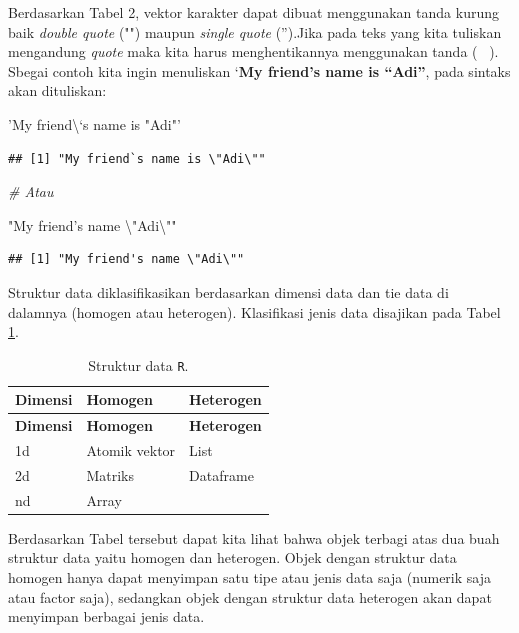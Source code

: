 \documentclass[]{book}
\newenvironment{Shaded}{\begin{snugshade}}{\end{snugshade}}
\newcommand{\CharTok}[1]{\textcolor[rgb]{0.31,0.60,0.02}{#1}}
\newcommand{\CommentTok}[1]{\textcolor[rgb]{0.56,0.35,0.01}{\textit{#1}}}
\newcommand{\StringTok}[1]{\textcolor[rgb]{0.31,0.60,0.02}{#1}}
\theoremstyle{definition}
\theoremstyle{definition}
\theoremstyle{definition}
\theoremstyle{remark}
\begin{document}
Berdasarkan Tabel 2, vektor karakter dapat dibuat menggunakan tanda kurung baik \emph{double quote} ("") maupun \emph{single quote} ('').Jika pada teks yang kita tuliskan mengandung \emph{quote} maka kita harus menghentikannya menggunakan tanda ( ~). Sbegai contoh kita ingin menuliskan `\textbf{My friend's name is ``Adi''}, pada sintaks akan dituliskan:

\begin{Shaded}
\begin{Highlighting}[]
\StringTok{'My friend\textbackslash{}`s name is "Adi"'}
\end{Highlighting}
\end{Shaded}

\begin{verbatim}
## [1] "My friend`s name is \"Adi\""
\end{verbatim}

\begin{Shaded}
\begin{Highlighting}[]
\CommentTok{# Atau}

\StringTok{"My friend's name }\CharTok{\textbackslash{}"}\StringTok{Adi}\CharTok{\textbackslash{}"}\StringTok{"}
\end{Highlighting}
\end{Shaded}

\begin{verbatim}
## [1] "My friend's name \"Adi\""
\end{verbatim}

Struktur data diklasifikasikan berdasarkan dimensi data dan tie data di dalamnya (homogen atau heterogen). Klasifikasi jenis data disajikan pada Tabel \ref{tab:strukturdata}.

\begin{longtable}[]{@{}lll@{}}
\caption{\label{tab:strukturdata} Struktur data \texttt{R}.}\tabularnewline
\toprule
\textbf{Dimensi} & \textbf{Homogen} & \textbf{Heterogen}\tabularnewline
\midrule
\endfirsthead
\toprule
\textbf{Dimensi} & \textbf{Homogen} & \textbf{Heterogen}\tabularnewline
\midrule
\endhead
1d & Atomik vektor & List\tabularnewline
2d & Matriks & Dataframe\tabularnewline
nd & Array &\tabularnewline
\bottomrule
\end{longtable}

Berdasarkan Tabel tersebut dapat kita lihat bahwa objek terbagi atas dua buah struktur data yaitu homogen dan heterogen. Objek dengan struktur data homogen hanya dapat menyimpan satu tipe atau jenis data saja (numerik saja atau factor saja), sedangkan objek dengan struktur data heterogen akan dapat menyimpan berbagai jenis data.
\end{document}
